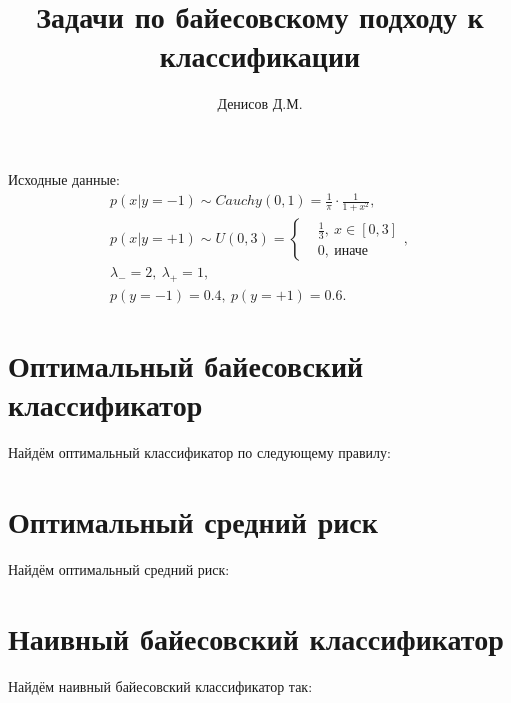 \documentclass[14pt,a4paper]{article}
\title{Задачи по байесовскому подходу к классификации}
\author{Денисов Д.М.}
\date{}
\begin{document}
    \maketitle

    Исходные данные:
    \begin{equation}
        \begin{gathered}
            p(x | y = -1) \sim Cauchy(0, 1) = \frac{1}{\pi} \cdot \frac{1}{1 + x^2}, \\
            p(x | y = +1) \sim U(0, 3) = 
            \left\{
                \begin{aligned}
                    & \frac{1}{3}, \ x \in [0, 3] \\
                    & 0, \ \text{иначе}
                \end{aligned}
            \right., \\
            \lambda_{-} = 2, \ \lambda_{+} = 1, \\
            p(y = -1) =  0.4, \ p(y = +1) = 0.6.
        \end{gathered}
    \end{equation}

    \section{Оптимальный байесовский классификатор}
    Найдём оптимальный классификатор по следующему правилу:

    \section{Оптимальный средний риск}
    Найдём оптимальный средний риск:

    \section{Наивный байесовский классификатор}
    Найдём наивный байесовский классификатор так:
\end{document}
